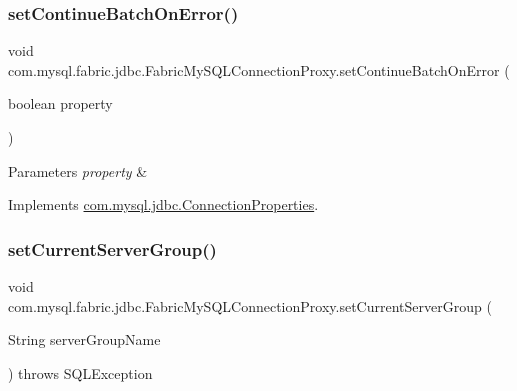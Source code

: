 \subsubsection{\texorpdfstring{set\+Continue\+Batch\+On\+Error()}{setContinueBatchOnError()}}
{\footnotesize\ttfamily void com.\+mysql.\+fabric.\+jdbc.\+Fabric\+My\+S\+Q\+L\+Connection\+Proxy.\+set\+Continue\+Batch\+On\+Error (\begin{DoxyParamCaption}\item[{boolean}]{property }\end{DoxyParamCaption})}


\begin{DoxyParams}{Parameters}
{\em property} & \\
\hline
\end{DoxyParams}


Implements \mbox{\hyperlink{interfacecom_1_1mysql_1_1jdbc_1_1_connection_properties_a5f3f94fedf8c3162e2b825279a9d01ed}{com.\+mysql.\+jdbc.\+Connection\+Properties}}.

\mbox{\label{classcom_1_1mysql_1_1fabric_1_1jdbc_1_1_fabric_my_s_q_l_connection_proxy_af555e33c27a54d2dbdc7e109f2b3c3a2}} 
\subsubsection{\texorpdfstring{set\+Current\+Server\+Group()}{setCurrentServerGroup()}}
{\footnotesize\ttfamily void com.\+mysql.\+fabric.\+jdbc.\+Fabric\+My\+S\+Q\+L\+Connection\+Proxy.\+set\+Current\+Server\+Group (\begin{DoxyParamCaption}\item[{String}]{server\+Group\+Name }\end{DoxyParamCaption}) throws S\+Q\+L\+Exception\hspace{0.3cm}{\ttfamily [protected]}}

